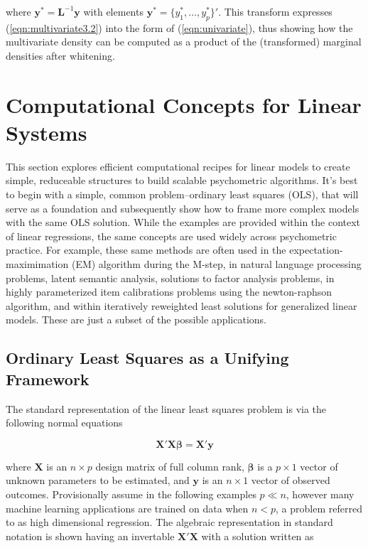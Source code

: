 \documentclass[12pt]{article}
\begin{document}
\noindent where $\bm{y}^* = \bm{L}^{-1}\bm{y}$ with elements $\bm{y}^{*} = \{y_1^*, \ldots, y_p^*\}'$. This transform expresses (\ref{eqn:multivariate3.2}) into the form of (\ref{eqn:univariate}), thus showing how the multivariate density can be computed as a product of the (transformed) marginal densities after whitening.

\section*{Computational Concepts for Linear Systems}

This section explores efficient computational recipes for linear models to create simple, reduceable structures to build scalable psychometric algorithms. It's best to begin with a simple, common problem--ordinary least squares (OLS), that will serve as a foundation and subsequently show how to frame more complex models with the same OLS solution. While the examples are provided within the context of linear regressions, the same concepts are used widely across psychometric practice. For example, these same methods are often used in the expectation-maximimation (EM) algorithm during the M-step, in natural language processing problems, latent semantic analysis, solutions to factor analysis problems, in highly parameterized item calibrations problems using the newton-raphson algorithm, and within iteratively reweighted least solutions for generalized linear models. These are just a subset of the possible applications.  

\subsection*{Ordinary Least Squares as a Unifying Framework}

The standard representation of the linear least squares problem is via the following normal equations \cite{mcandsearle:2001}   

\begin{equation}
\label{eqn:normal}
\bm{X'X\beta} = \bm{X'y}
\end{equation}

\noindent where $\bm{X}$ is an $n \times p$ design matrix of full column rank, $\bm{\beta}$ is a $p \times 1$ vector of unknown parameters to be estimated, and $\bm{y}$ is an $n \times 1$ vector of observed outcomes. Provisionally assume in the following examples $p \ll n$, however many machine learning applications are trained on data when $n < p$, a problem referred to as high dimensional regression. The algebraic representation in standard notation is shown having an invertable $\bm{X'X}$ with a solution written as
\end{document}
